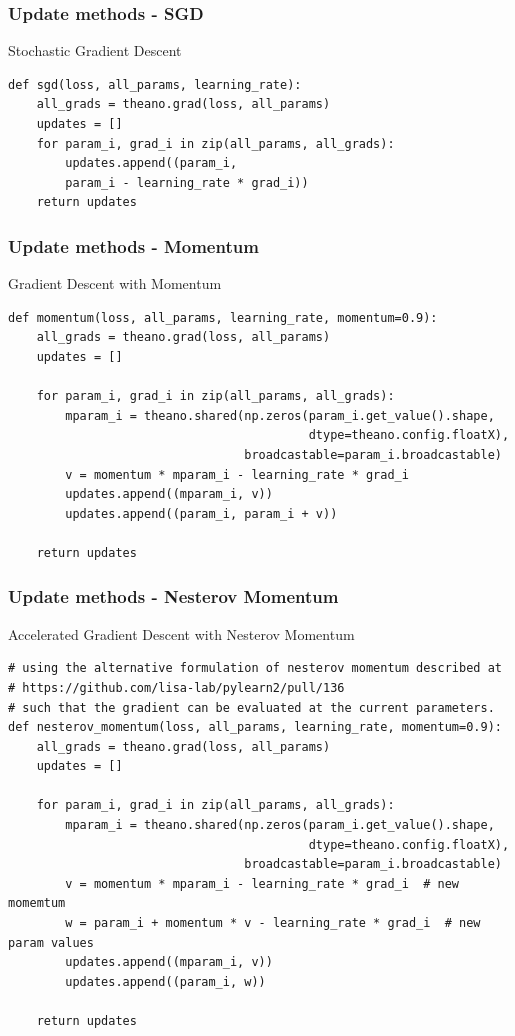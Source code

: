 \documentclass{beamer}
\begin{document}
\begin{frame}[fragile]
    \frametitle{Update methods - SGD}
    \begin{block}{Stochastic Gradient Descent}
    \begin{verbatim}
def sgd(loss, all_params, learning_rate):
    all_grads = theano.grad(loss, all_params)
    updates = []
    for param_i, grad_i in zip(all_params, all_grads):
        updates.append((param_i,
        param_i - learning_rate * grad_i))
    return updates
    \end{verbatim}
\end{block}

\end{frame}

\begin{frame}[fragile]
    \frametitle{Update methods - Momentum}
    \begin{block}{Gradient Descent with Momentum}
    \begin{verbatim}
def momentum(loss, all_params, learning_rate, momentum=0.9):
    all_grads = theano.grad(loss, all_params)
    updates = []

    for param_i, grad_i in zip(all_params, all_grads):
        mparam_i = theano.shared(np.zeros(param_i.get_value().shape,
                                          dtype=theano.config.floatX),
                                 broadcastable=param_i.broadcastable)
        v = momentum * mparam_i - learning_rate * grad_i
        updates.append((mparam_i, v))
        updates.append((param_i, param_i + v))

    return updates
    \end{verbatim}
\end{block}
\end{frame}


\begin{frame}[fragile]
    \frametitle{Update methods - Nesterov Momentum}
    \begin{block}{Accelerated Gradient Descent with Nesterov Momentum}
    \begin{verbatim}
# using the alternative formulation of nesterov momentum described at
# https://github.com/lisa-lab/pylearn2/pull/136
# such that the gradient can be evaluated at the current parameters.
def nesterov_momentum(loss, all_params, learning_rate, momentum=0.9):
    all_grads = theano.grad(loss, all_params)
    updates = []

    for param_i, grad_i in zip(all_params, all_grads):
        mparam_i = theano.shared(np.zeros(param_i.get_value().shape,
                                          dtype=theano.config.floatX),
                                 broadcastable=param_i.broadcastable)
        v = momentum * mparam_i - learning_rate * grad_i  # new momemtum
        w = param_i + momentum * v - learning_rate * grad_i  # new param values
        updates.append((mparam_i, v))
        updates.append((param_i, w))

    return updates
\end{verbatim}
\end{block}
\end{frame}
\end{document}
